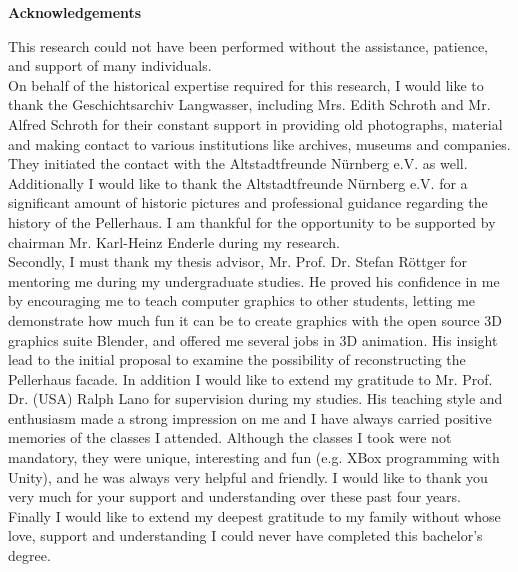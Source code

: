 \thispagestyle{plain}
\begin{center}
	
	\LARGE
	\textbf{Acknowledgements}
	
\end{center}
\vspace{100pt}

This research could not have been performed without the assistance, patience, and support of many individuals.\\

On behalf of the historical expertise required for this research, I would like to thank the Geschichtsarchiv Langwasser, including Mrs. Edith Schroth and Mr. Alfred Schroth for their constant support in providing old photographs, material and making contact to various institutions like archives, museums and companies. They initiated the contact with the Altstadtfreunde Nürnberg e.V. as well.\\
Additionally I would like to thank the Altstadtfreunde Nürnberg e.V. for a significant amount of historic pictures and professional guidance regarding the history of the Pellerhaus. I am thankful for the opportunity to be supported by chairman Mr. Karl-Heinz Enderle during my research.\\

Secondly, I must thank my thesis advisor, Mr. Prof. Dr. Stefan Röttger for mentoring me during my undergraduate studies. He proved his confidence in me by encouraging me to teach computer graphics to other students, letting me demonstrate how much fun it can be to create graphics with the open source 3D graphics suite Blender, and offered me several jobs in 3D animation. His insight lead to the initial proposal to examine the possibility of reconstructing the Pellerhaus facade. In addition I would like to extend my gratitude to Mr. Prof. Dr. (USA) Ralph Lano for supervision during my studies. His teaching style and enthusiasm made a strong impression on me and I have always carried positive memories of the classes I attended. Although the classes I took were not mandatory, they were unique, interesting and fun (e.g. XBox programming with Unity), and he was always very helpful and friendly. I would like to thank you very much for your support and understanding over these past four years.\\

Finally I would like to extend my deepest gratitude to my family without whose love, support and understanding I could never have completed this bachelor's degree.
